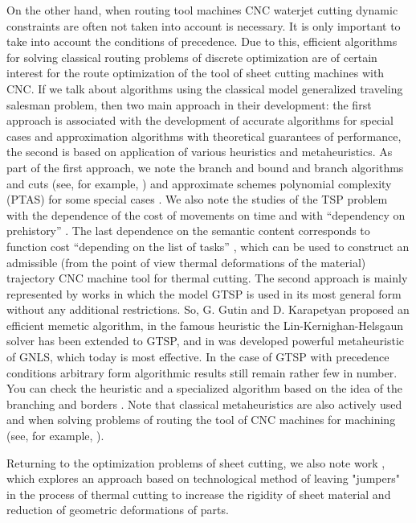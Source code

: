 \documentclass[10pt]{article}
\begin{document}
On the other hand, when routing tool machines
CNC waterjet cutting dynamic constraints are often not taken into account
is necessary. It is only important to take into account the conditions of precedence.
Due to this,
efficient algorithms for solving classical routing problems of discrete optimization are of certain interest for the route optimization of the tool of sheet cutting machines with CNC.
If we talk about algorithms using the classical model
generalized traveling salesman problem, then two main
approach in their development:
the first approach is associated with the development of accurate
algorithms for special cases and approximation algorithms with
theoretical guarantees of performance, the second is based on
application of various heuristics and metaheuristics.
As part of the first approach, we note the branch and bound and branch algorithms
and cuts (see, for example, \cite{bibx:228}) and approximate schemes
polynomial complexity (PTAS) for some special cases
\cite{bibx:214}. We also note the studies of the TSP problem with
the dependence of the cost of movements on time
\cite{bibx:218,bibx:219} and with ``dependency on
prehistory''
\cite{bibx:221}. The last dependence on the semantic
content corresponds to function
cost ``depending on the list of tasks''
\cite{1,3}, which
can be used to construct an admissible (from the point of view
thermal deformations of the material) trajectory
CNC machine tool for thermal cutting.
The second approach is mainly represented by works in which the model
GTSP is used in its most general form without any additional
restrictions. So, G. Gutin and D. Karapetyan \cite{Gutin-2010}
proposed an efficient memetic algorithm, in
\cite{Helsgaun-2015} the famous heuristic
the Lin-Kernighan-Helsgaun solver has been extended to GTSP,
and in \cite{bibx:230} was developed
powerful metaheuristic of GNLS, which today is
most effective. In the case of GTSP with precedence conditions
arbitrary form algorithmic results still remain
rather few in number. You can check the \cite{SALMAN2016} heuristic
and a specialized algorithm based on the idea of the branching and
borders \cite{SALMAN2020}.
Note that classical metaheuristics are also actively used and
when solving problems of routing the tool of CNC machines for
machining (see, for example, \cite{bibx:305,bibx:300,bibx:304}).

Returning to the optimization problems of sheet cutting, we also note
work \cite{bibx:117}, which explores an approach based on
technological method of leaving "jumpers" in the process of thermal
cutting to increase the rigidity of sheet material
and reduction of geometric deformations of parts.
\end{document}
